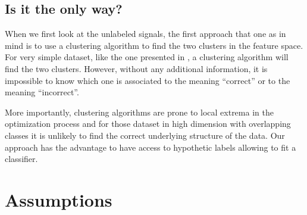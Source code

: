 
\subsection{Is it the only way?}

When we first look at the unlabeled signals, the first approach that one as in mind is to use a clustering algorithm to find the two clusters in the feature space. For very simple dataset, like the one presented in , a clustering algorithm will find the two clusters. However, without any additional information, it is impossible to know which one is associated to the meaning ``correct'' or to the meaning ``incorrect''.

More importantly, clustering algorithms are prone to local extrema in the optimization process and for those dataset in high dimension with overlapping classes it is unlikely to find the correct underlying structure of the data. Our approach has the advantage to have access to hypothetic labels allowing to fit a classifier.

\section{Assumptions}

